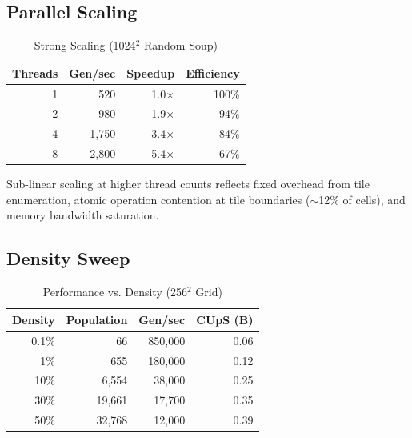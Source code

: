 \documentclass[11pt]{article}
\theoremstyle{definition}
\begin{document}
    \subsection{Parallel Scaling}

    \begin{table}[h]
        \centering
        \caption{Strong Scaling (1024$^2$ Random Soup)}
        \begin{tabular}{@{}rrrr@{}}
            \toprule
            \textbf{Threads} & \textbf{Gen/sec} & \textbf{Speedup} & \textbf{Efficiency} \\
            \midrule
            1 & 520 & 1.0$\times$ & 100\% \\
            2 & 980 & 1.9$\times$ & 94\% \\
            4 & 1,750 & 3.4$\times$ & 84\% \\
            8 & 2,800 & 5.4$\times$ & 67\% \\
            \bottomrule
        \end{tabular}
    \end{table}

    Sub-linear scaling at higher thread counts reflects fixed overhead from tile enumeration, atomic operation contention at tile boundaries ($\sim$12\% of cells), and memory bandwidth saturation.

    \subsection{Density Sweep}

    \begin{table}[h]
        \centering
        \caption{Performance vs. Density (256$^2$ Grid)}
        \begin{tabular}{@{}rrrr@{}}
            \toprule
            \textbf{Density} & \textbf{Population} & \textbf{Gen/sec} & \textbf{CUpS (B)} \\
            \midrule
            0.1\% & 66 & 850,000 & 0.06 \\
            1\% & 655 & 180,000 & 0.12 \\
            10\% & 6,554 & 38,000 & 0.25 \\
            30\% & 19,661 & 17,700 & 0.35 \\
            50\% & 32,768 & 12,000 & 0.39 \\
            \bottomrule
        \end{tabular}
    \end{table}
\end{document}
